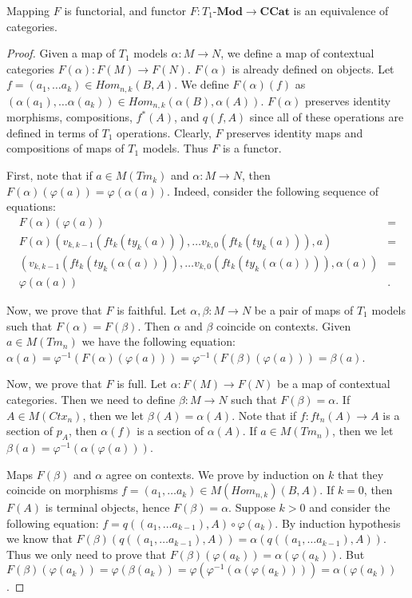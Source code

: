 \documentclass{amsart}
\theoremstyle{definition}
\theoremstyle{remark}
\newcommand{\cat}[1]{\mathbf{#1}}
\newcommand{\ccat}{\cat{CCat}}
\newcommand{\Mod}{\text{-}\cat{Mod}}
\numberwithin{figure}{section}
\begin{document}
\begin{prop}
Mapping $F$ is functorial, and functor $F : T_1\Mod \to \ccat$ is an equivalence of categories.
\end{prop}
\begin{proof}
Given a map of $T_1$ models $\alpha : M \to N$, we define a map of contextual categories $F(\alpha) : F(M) \to F(N)$.
$F(\alpha)$ is already defined on objects.
Let $f = (a_1, \ldots a_k) \in Hom_{n,k}(B,A)$.
We define $F(\alpha)(f)$ as $(\alpha(a_1), \ldots \alpha(a_k)) \in Hom_{n,k}(\alpha(B), \alpha(A))$.
$F(\alpha)$ preserves identity morphisms, compositions, $f^*(A)$, and $q(f,A)$ since all of these operations are defined in terms of $T_1$ operations.
Clearly, $F$ preserves identity maps and compositions of maps of $T_1$ models.
Thus $F$ is a functor.

First, note that if $a \in M(Tm_k)$ and $\alpha : M \to N$, then $F(\alpha)(\varphi(a)) = \varphi(\alpha(a))$.
Indeed, consider the following sequence of equations:
\begin{align*}
F(\alpha)(\varphi(a)) & = \\
F(\alpha)(v_{k,k-1}(ft_k(ty_k(a))), \ldots v_{k,0}(ft_k(ty_k(a))), a) & = \\
(v_{k,k-1}(ft_k(ty_k(\alpha(a)))), \ldots v_{k,0}(ft_k(ty_k(\alpha(a)))), \alpha(a)) & = \\
\varphi(\alpha(a)) & .
\end{align*}

Now, we prove that $F$ is faithful.
Let $\alpha,\beta : M \to N$ be a pair of maps of $T_1$ models such that $F(\alpha) = F(\beta)$.
Then $\alpha$ and $\beta$ coincide on contexts.
Given $a \in M(Tm_n)$ we have the following equation: $\alpha(a) = \varphi^{-1}(F(\alpha)(\varphi(a))) = \varphi^{-1}(F(\beta)(\varphi(a))) = \beta(a)$.

Now, we prove that $F$ is full.
Let $\alpha : F(M) \to F(N)$ be a map of contextual categories.
Then we need to define $\beta : M \to N$ such that $F(\beta) = \alpha$.
If $A \in M(Ctx_n)$, then we let $\beta(A) = \alpha(A)$.
Note that if $f : ft_n(A) \to A$ is a section of $p_A$, then $\alpha(f)$ is a section of $\alpha(A)$.
If $a \in M(Tm_n)$, then we let $\beta(a) = \varphi^{-1}(\alpha(\varphi(a)))$.

Maps $F(\beta)$ and $\alpha$ agree on contexts.
We prove by induction on $k$ that they coincide on morphisms $f = (a_1, \ldots a_k) \in M(Hom_{n,k})(B,A)$.
If $k = 0$, then $F(A)$ is terminal objects, hence $F(\beta) = \alpha$.
Suppose $k > 0$ and consider the following equation: $f = q((a_1, \ldots a_{k-1}), A) \circ \varphi(a_k)$.
By induction hypothesis we know that $F(\beta)(q((a_1, \ldots a_{k-1}), A)) = \alpha(q((a_1, \ldots a_{k-1}), A))$.
Thus we only need to prove that $F(\beta)(\varphi(a_k)) = \alpha(\varphi(a_k))$.
But $F(\beta)(\varphi(a_k)) = \varphi(\beta(a_k)) = \varphi(\varphi^{-1}(\alpha(\varphi(a_k)))) = \alpha(\varphi(a_k))$.


\end{proof}
\end{document}
